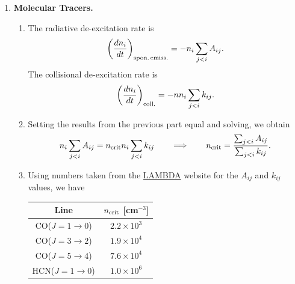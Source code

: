 \solutionset

\begin{enumerate}

\item \textbf{Molecular Tracers.}

\begin{enumerate}

\item The radiative de-excitation rate is
\begin{displaymath}
\left(\frac{dn_i}{dt}\right)_{\rm spon.\,emiss.} = -n_i \sum_{j<i} A_{ij} .
\end{displaymath}
The collisional de-excitation rate is
\begin{displaymath}
\left(\frac{dn_i}{dt}\right)_{\rm coll.} = -n n_i \sum_{j<i} k_{ij}.
\end{displaymath}

\item Setting the results from the previous part equal and solving, we obtain
\begin{displaymath}
 n_i \sum_{j<i} A_{ij} = n_{\rm crit} n_i \sum_{j<i} k_{ij} 
 \qquad \Longrightarrow \qquad
 n_{\rm crit} = \frac{\sum_{j<i} A_{ij}}{\sum_{j<i} k_{ij}}.
 \end{displaymath}
 
\item
Using numbers taken from the \href{http://www.strw.leidenuniv.nl/~moldata}{LAMBDA} website for the $A_{ij}$ and $k_{ij}$ values, we have
\begin{center}
\begin{tabular}{c|c}
Line & $n_{\rm crit}$ [cm$^{-3}$] \\ \hline
CO($J=1\rightarrow 0$) & $2.2\times 10^3$ \\
CO($J=3\rightarrow 2$) & $1.9 \times 10^4$ \\
CO($J=5\rightarrow 4$) & $7.6\times 10^4$ \\
HCN($J=1\rightarrow 0$) & $1.0\times 10^6$
\end{tabular}
\end{center}


\end{enumerate}
\end{enumerate}

